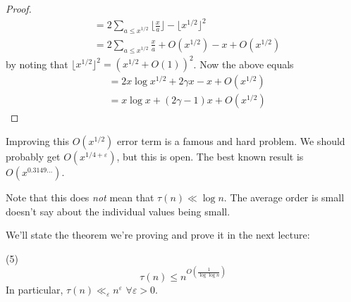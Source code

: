 \documentclass[a4paper]{article}
\begin{document}
\begin{thm}
\begin{proof}
\begin{equation*}
\begin{aligned}
&= 2 \sum_{a \leq x^{1/2}} \lfloor \frac{x}{a} \rfloor - \lfloor x^{1/2} \rfloor^2\\
&= 2 \sum_{a \leq x^{1/2}} \frac{x}{a} + O(x^{1/2}) - x + O(x^{1/2})
\end{aligned}
\end{equation*}
by noting that $\lfloor x^{1/2}\rfloor^2 = (x^{1/2} + O(1))^2$. Now the above equals
\begin{equation*}
\begin{aligned}
&=2x\log x^{1/2} + 2\gamma x - x + O(x^{1/2})\\
&= x\log x + (2\gamma-1) x + O(x^{1/2})
\end{aligned}
\end{equation*}
\end{proof}

Improving this $O(x^{1/2})$ error term is a famous and hard problem. We should probably get $O(x^{1/4+\varepsilon})$, but this is open. The best known result is $O(x^{0.3149...})$.
\end{thm}

Note that this does \emph{not} mean that $\tau(n) \ll \log n$. The average order is small doesn't say about the individual values being small.

We'll state the theorem we're proving and prove it in the next lecture:
\begin{thm} (5)\\
$$\tau(n) \leq n^{O(\frac{1}{\log\log n})}$$
In particular, $\tau(n) \ll_\varepsilon n^\varepsilon$ $\forall \varepsilon > 0$.
\end{thm}
\end{document}
